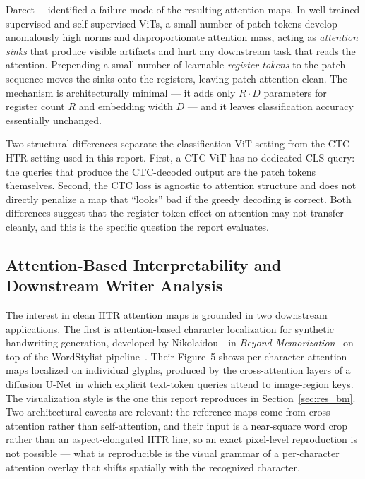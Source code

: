 Darcet~\etal~\cite{darcet2024registers} identified a failure mode of the resulting attention maps. In well-trained supervised and self-supervised ViTs, a small number of patch tokens develop anomalously high norms and disproportionate attention mass, acting as \emph{attention sinks} that produce visible artifacts and hurt any downstream task that reads the attention. Prepending a small number of learnable \emph{register tokens} to the patch sequence moves the sinks onto the registers, leaving patch attention clean. The mechanism is architecturally minimal --- it adds only $R \cdot D$ parameters for register count $R$ and embedding width $D$ --- and it leaves classification accuracy essentially unchanged.

Two structural differences separate the classification-ViT setting from the CTC HTR setting used in this report. First, a CTC ViT has no dedicated CLS query: the queries that produce the CTC-decoded output are the patch tokens themselves. Second, the CTC loss is agnostic to attention structure and does not directly penalize a map that ``looks'' bad if the greedy decoding is correct. Both differences suggest that the register-token effect on attention may not transfer cleanly, and this is the specific question the report evaluates.

\subsection{Attention-Based Interpretability and Downstream Writer Analysis}
\label{sec:rw_interp}

The interest in clean HTR attention maps is grounded in two downstream applications. The first is attention-based character localization for synthetic handwriting generation, developed by Nikolaidou~\etal\ in \emph{Beyond Memorization}~\cite{nikolaidou2024beyondmem} on top of the WordStylist pipeline~\cite{nikolaidou2023wordstylist}. Their Figure~5 shows per-character attention maps localized on individual glyphs, produced by the cross-attention layers of a diffusion U-Net in which explicit text-token queries attend to image-region keys. The visualization style is the one this report reproduces in Section~\ref{sec:res_bm}. Two architectural caveats are relevant: the reference maps come from cross-attention rather than self-attention, and their input is a near-square word crop rather than an aspect-elongated HTR line, so an exact pixel-level reproduction is not possible --- what is reproducible is the visual grammar of a per-character attention overlay that shifts spatially with the recognized character.

